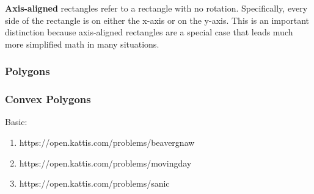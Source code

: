 \textbf{Axis-aligned} rectangles refer to a rectangle with no rotation. Specifically, every side of the rectangle is on either the x-axis or on the y-axis. This is an important distinction because axis-aligned rectangles are a special case that leads much more simplified math in many situations.

\subsubsection{Polygons}

\subsubsection{Convex Polygons}

\hrulefill

Basic:
\begin{enumerate}
\item https://open.kattis.com/problems/beavergnaw
\item https://open.kattis.com/problems/movingday
\item https://open.kattis.com/problems/sanic
\end{enumerate}
